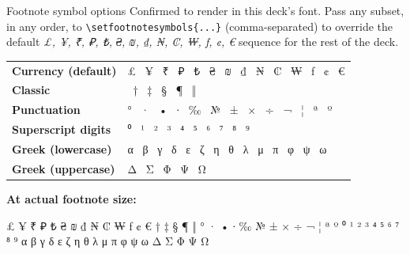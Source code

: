 %

\begin{standardframe}{Footnote symbol options}
\footnotesize
Confirmed to render in this deck's font. Pass any subset, in any order, to
\texttt{\textbackslash setfootnotesymbols\{...\}} (comma-separated) to
override the default \emph{£, ¥, ₹, ₽, ₺, ₴, ₪, ₫, ₦, ₡, ₩, ƒ, ¢, €} sequence
for the rest of the deck.

\vspace{0.4em}
{\renewcommand{\arraystretch}{1.7}\setlength{\tabcolsep}{4pt}
\begin{tabular}{@{}l l@{}}
\textbf{\footnotesize Currency (default)} & {\Large £ \ ¥ \ ₹ \ ₽ \ ₺ \ ₴ \ ₪ \ ₫ \ ₦ \ ₡ \ ₩ \ ƒ \ ¢ \ €} \\
\textbf{\footnotesize Classic} & {\Large * \ † \ ‡ \ § \ ¶ \ ‖} \\
\textbf{\footnotesize Punctuation} & {\Large ° \ · \ • \ ∙ \ ‰ \ № \ ± \ × \ ÷ \ ¬ \ ¦ \ ª \ º} \\
\textbf{\footnotesize Superscript digits} & {\Large ⁰ \ ¹ \ ² \ ³ \ ⁴ \ ⁵ \ ⁶ \ ⁷ \ ⁸ \ ⁹} \\
\textbf{\footnotesize Greek (lowercase)} & {\Large α \ β \ γ \ δ \ ε \ ζ \ η \ θ \ λ \ μ \ π \ φ \ ψ \ ω} \\
\textbf{\footnotesize Greek (uppercase)} & {\Large Δ \ Σ \ Φ \ Ψ \ Ω} \\
\end{tabular}}

\vspace{0.6em}
\textbf{\footnotesize At actual footnote size:}\\
{\fontsize{3.2}{4.5}\selectfont
£ ¥ ₹ ₽ ₺ ₴ ₪ ₫ ₦ ₡ ₩ ƒ ¢ € \quad * † ‡ § ¶ ‖ \quad ° · • ∙ ‰ № ± × ÷ ¬ ¦ ª º \quad ⁰ ¹ ² ³ ⁴ ⁵ ⁶ ⁷ ⁸ ⁹ \quad α β γ δ ε ζ η θ λ μ π φ ψ ω \quad Δ Σ Φ Ψ Ω
\par}

\end{standardframe}
